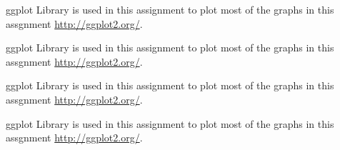 \documentclass[paper=a4, fontsize=11pt]{scrartcl} %
\numberwithin{equation}{section} %
\numberwithin{figure}{section} %
\numberwithin{table}{section} %
\begin{document}
\newpage
\begin{thebibliography}{}
 ggplot Library is used in this assignment to plot most of the graphs in this assgnment \url{http://ggplot2.org/}. 
 
 ggplot Library is used in this assignment to plot most of the graphs in this assgnment \url{http://ggplot2.org/}. 
 
 ggplot Library is used in this assignment to plot most of the graphs in this assgnment \url{http://ggplot2.org/}. 
 
 ggplot Library is used in this assignment to plot most of the graphs in this assgnment \url{http://ggplot2.org/}. 
  
\end{thebibliography}
\end{document}
